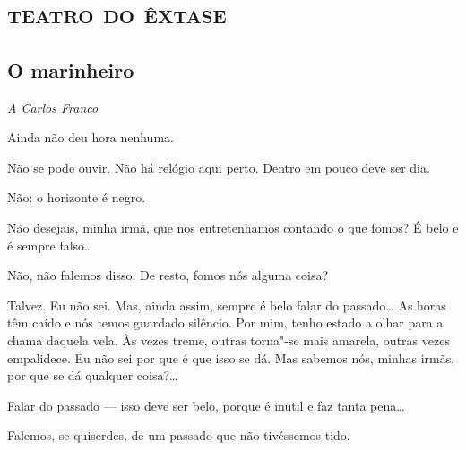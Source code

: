 \part{\textsc{teatro do êxtase}}

\chapter[O marinheiro]{O marinheiro}

\hfill\textit{A Carlos Franco}


 Ainda não deu hora nenhuma.

 Não se pode ouvir. Não há relógio aqui perto.
Dentro em pouco deve ser dia.

 Não: o horizonte é negro.

 Não desejais, minha irmã, que nos entretenhamos
contando o
que fomos? É belo e é sempre falso\ldots{}

 Não, não falemos disso. De resto,
fomos nós alguma coisa?

 Talvez. Eu não sei. Mas, ainda assim,
sempre é belo falar do
passado\ldots{} As horas têm caído e nós temos guardado
silêncio. Por mim,
tenho estado a olhar para a chama daquela vela.
Às vezes treme, outras
torna"-se mais amarela, outras vezes empalidece.
Eu não sei por que é
que isso se dá. Mas sabemos nós, minhas irmãs, por
que se dá qualquer coisa?\ldots{}

\hfill{} 

 Falar do passado --- isso deve ser belo,
porque é inútil e faz tanta pena\ldots{}

 Falemos, se quiserdes, de um passado
que não tivéssemos tido.

